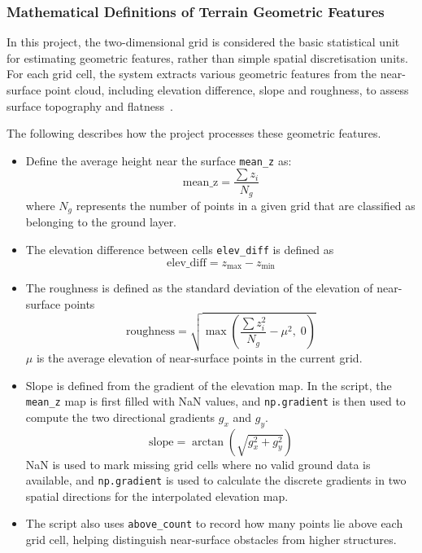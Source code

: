 \documentclass[12pt]{interim_report}
\begin{document}
\subsubsection{Mathematical Definitions of Terrain Geometric Features}
\label{subsec:chizou-geometric-features}

In this project, the two-dimensional grid is considered the basic statistical unit for estimating geometric features, rather than simple spatial discretisation units. For each grid cell, the system extracts various geometric features from the near-surface point cloud, including elevation difference, slope and roughness, to assess surface topography and flatness~\cite{meng2018terrain,carvalho2024traversability}.

The following describes how the project processes these geometric features.

\begin{itemize}
    \item Define the average height near the surface \texttt{mean\_z} as:
    \begin{equation}
        \mathrm{mean\_z} = \frac{\sum z_i}{N_g}
    \end{equation}
    where $N_g$ represents the number of points in a given grid that are classified as belonging to the ground layer.

    \item The elevation difference between cells \texttt{elev\_diff} is defined as
    \begin{equation}
        \mathrm{elev\_diff} = z_{\max} - z_{\min}
    \end{equation}

    \item The roughness is defined as the standard deviation of the elevation of near-surface points
    \begin{equation}
        \mathrm{roughness} = \sqrt{\max\!\left(\frac{\sum z_i^{2}}{N_g} - \mu^{2},\; 0\right)}
    \end{equation}
    $\mu$ is the average elevation of near-surface points in the current grid.

    \item Slope is defined from the gradient of the elevation map. In the script, the \texttt{mean\_z} map is first filled with NaN values, and \texttt{np.gradient} is then used to compute the two directional gradients $g_x$ and $g_y$.
    \begin{equation}
        \mathrm{slope} = \arctan\!\left(\sqrt{g_x^{2} + g_y^{2}}\right)
    \end{equation}
    NaN is used to mark missing grid cells where no valid ground data is available, and \texttt{np.gradient} is used to calculate the discrete gradients in two spatial directions for the interpolated elevation map.

    \item The script also uses \texttt{above\_count} to record how many points lie above each grid cell, helping distinguish near-surface obstacles from higher structures.
\end{itemize}
\end{document}
